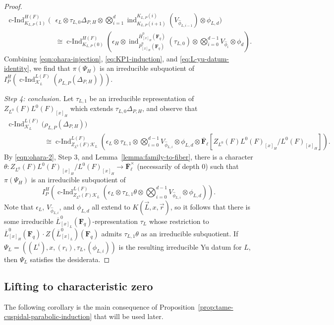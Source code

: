 \documentclass[reqno]{amsart}
\numberwithin{equation}{subsection}
\newcommand{\F}{\mathbf{F}}
\newcommand{\ol}[1]{\overline{#1}}
\newcommand{\wh}[1]{\widehat{#1}}
\newcommand{\co}{\colon}
\newcommand\cK{\mathcal{K}}
\DeclareMathOperator{\ind}{ind}
\DeclareMathOperator{\cInd}{c-Ind}
\theoremstyle{remark}
\numberwithin{equation}{subsection}
\numberwithin{figure}{subsection}
\begin{document}
\begin{proof}
\begin{align}\label{eq:L-yu-datum-identity}
\cInd_{K_{L,P}(1)}^{H(F)}(&\epsilon_L \otimes \tau_{L,0}\Delta_{P,H} \otimes \bigotimes_{i=1}^{d} \ind_{K_{L,P}(i+1)}^{K_{L,P}(i)}(V_{\wh\phi_{L,i-1}}) \otimes \phi_{L,d}) \nonumber \\
    &\cong\cInd_{K_{L,P}(0)}^{H(F)}(\epsilon_H \otimes \ind_{\ol P^0_{[x]_H}(\F_q)}^{\ol H^0_{[x]_H}(\F_q)}(\tau_{L,0}) \otimes \bigotimes_{i=0}^{d-1} V_{\wh\phi_i} \otimes \phi_d).
\end{align}
Combining \eqref{eqn:ohara-injection}, \eqref{eq:KP1-induction}, and \eqref{eq:L-yu-datum-identity}, we find that $\pi(\Psi_H)$ is an irreducible subquotient of $I_P^H(\cInd_{\cK_L}^{L(F)}(\rho_{L,P}(\Delta_{P,H})))$.

\emph{Step 4: conclusion.} Let $\tau_{L,1}$ be an irreducible representation of $Z_{L^0}(F)L^0(F)_{[x]_H}$ which extends $\tau_{L,0}\Delta_{P,H}$, and observe that 
\begin{align}\label{eqn:ohara-2}
\cInd_{\cK_L}^{L(F)}(&\rho_{L,P}(\Delta_{P,H})) \nonumber\\
&\cong \cInd_{Z_{L^0}(F)\cK_L}^{L(F)}(\epsilon_L \otimes \tau_{L,1} \otimes \bigotimes_{i=0}^{d-1} V_{\wh \phi_{L,i}} \otimes \phi_{L,d} \otimes \ol\F_\ell[Z_{L^0}(F)L^0(F)_{[x]_H}/L^0(F)_{[x]_H}]).
\end{align}
By \eqref{eqn:ohara-2}, Step 3, and Lemma~\ref{lemma:family-to-fiber}, there is a character $\theta\co Z_{L^0}(F)L^0(F)_{[x]_H}/L^0(F)_{[x]_H} \to \ol\F_\ell^\times$ (necessarily of depth $0$) such that $\pi(\Psi_H)$ is an irreducible subquotient of
\[
I_P^H(\cInd_{Z_{L^0}(F)\cK_L}^{L(F)}(\epsilon_L \otimes \tau_{L,1}\theta \otimes \bigotimes_{i=0}^{d-1} V_{\wh \phi_{L,i}} \otimes \phi_{L,d})).
\]
Note that $\epsilon_L$, $V_{\wh\phi_{L,i}}$, and $\phi_{L,d}$ all extend to $K(\vec{L},x,\vec{r})$, so it follows that there is some irreducible $\ol L^0_{[x]_L}(\F_q)$-representation $\tau_L$ whose restriction to $\ol L^0_{[x]_H}(\F_q) \cdot Z(\ol L^0_{[x]_L})(\F_q)$ admits $\tau_{L,1}\theta$ as an irreducible subquotient. If $\Psi_L=((L^i),x,(r_i),\tau_L,(\phi_{L,i}))$ is the resulting irreducible Yu datum for $L$, then $\Psi_L$ satisfies the desiderata.
\end{proof}

\subsection{Lifting to characteristic zero} 
The following corollary is the main consequence of Proposition~\ref{prop:tame-cuspidal-parabolic-induction} that will be used later. 
\end{document}
